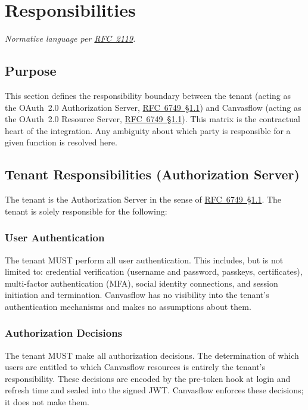 \section{Responsibilities}

\textit{Normative language per \href{https://tools.ietf.org/html/rfc2119}{RFC~2119}.}

\subsection{Purpose}

This section defines the responsibility boundary between the tenant (acting as the
OAuth~2.0 Authorization Server, 
\href{https://datatracker.ietf.org/doc/html/rfc6749#section-1.1}{RFC~6749~\S1.1}) 
and Canvasflow (acting as the OAuth~2.0 Resource Server, 
\href{https://datatracker.ietf.org/doc/html/rfc6749#section-1.1}{RFC~6749~\S1.1}). 
This matrix is the contractual heart of the integration. Any ambiguity about 
which party is responsible for a given function is resolved here.

\subsection{Tenant Responsibilities (Authorization Server)}

The tenant is the Authorization Server in the sense of 
\href{https://datatracker.ietf.org/doc/html/rfc6749#section-1.1}{RFC~6749~\S1.1}. 
The tenant is solely responsible for the following:

\subsubsection{User Authentication}

The tenant MUST perform all user authentication. This includes, but is not limited to:
credential verification (username and password, passkeys, certificates),
multi-factor authentication (MFA), social identity connections, and session initiation
and termination. Canvasflow has no visibility into the tenant's authentication mechanisms
and makes no assumptions about them.

\subsubsection{Authorization Decisions}

The tenant MUST make all authorization decisions. The determination of which users are
entitled to which Canvasflow resources is entirely the tenant's responsibility. These
decisions are encoded by the pre-token hook at login and refresh time and sealed into
the signed JWT. Canvasflow enforces these decisions; it does not make them.

